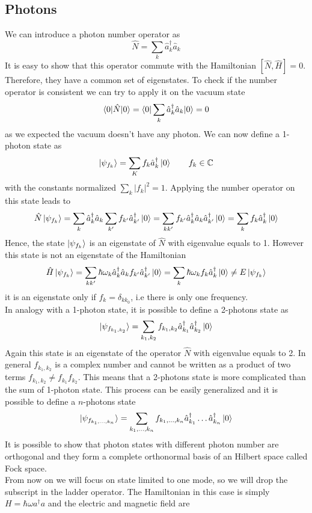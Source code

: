 \documentclass[12pt]{article}
\theoremstyle{plain}
\newcommand{\C}{\mathbb{C}}
\theoremstyle{definition}
\theoremstyle{remark}
\begin{document}
\subsection{Photons}
We can introduce a photon number operator as
\[\hat{N} = \sum_k \hat{a}_k^\dagger \hat{a}_k\]
It is easy to show that this operator commute with the Hamiltonian $[\hat{N},\hat{H}] = 0$. Therefore, they have a common set of eigenstates. To check if the number operator is consistent we can try to apply it on the vacuum state
\[\braket{0|\hat{N}|0} = \braket{0|\sum_k \hat{a}_k^\dagger \hat{a}_k |0}= 0\]
as we expected the vacuum doesn't have any photon. We can now define a 1-photon state as
\[\ket{\psi_{f_k}} = \sum_K f_k \hat{a}_k^\dagger \ket{0} \qquad f_k\in \C \]
with the constants normalized $\sum_k |f_k|^2=1$.  Applying the number operator on this state leads to
\[\hat{N}\ket{\psi_{f_k}} = \sum_k\hat{a}_k^\dagger \hat{a}_k \sum_{k'} f_{k'}\hat{a}_{k'}^\dagger \ket{0} = \sum_{kk'}f_{k'}\hat{a}_k^\dagger \hat{a}_k \hat{a}_{k'}^\dagger \ket{0}= \sum_k f_k \hat{a}_k^\dagger \ket{0}\]
Hence, the state $\ket{\psi_{f_k}}$ is an eigenstate of $\hat{N}$ with eigenvalue equals to 1. However this state is not an eigenstate of the Hamiltonian
\[\hat{H}\ket{\psi_{f_k}} = \sum_{kk'} \hbar \omega_k \hat{a}_k^\dagger \hat{a}_kf_{k'}\hat{a}_{k'}^\dagger \ket{0} = \sum_k \hbar \omega_kf_k \hat{a}_k^\dagger \ket{0} \neq E \ket{\psi_{f_k}}\]
it is an eigenstate only if $f_k = \delta_{kk_0}$, i.e there is only one frequency.\\
In analogy with a 1-photon state, it is possible to define a 2-photons state as
\[\ket{\psi_{f_{k_1,k_2}}} = \sum_{k_1,k_2}f_{k_1,k_2}\hat{a}_{k_1}^\dagger \hat{a}_{k_2}^\dagger \ket{0} \]
Again this state is an eigenstate of the operator $\hat{N}$ with eigenvalue equals to 2. In general $f_{k_1,k_2}$ is a complex number and cannot be written as a product of two terms $f_{k_1,k_2} \neq f_{k_1}f_{k_2}$. This means that a 2-photons state is more complicated than the sum of 1-photon state. This process can be easily generalized and it is possible to define a $n$-photons state
\[\ket{\psi_{f_{k_1,\dots,k_n}}} = \sum_{k_1,\dots,k_n} f_{k_1,\dots,k_n}\hat{a}_{k_1}^\dagger\dots \hat{a}_{k_n}^\dagger\ket{0}\]
It is possible to show that photon states with different photon number are orthogonal and they form a complete orthonormal basis of an Hilbert space called Fock space.\\
From now on we will focus on state limited to one mode, so we will drop the subscript in the ladder operator. The Hamiltonian in this case is simply $H = \hbar \omega a^\dagger a$ and the electric and magnetic field are
\end{document}
